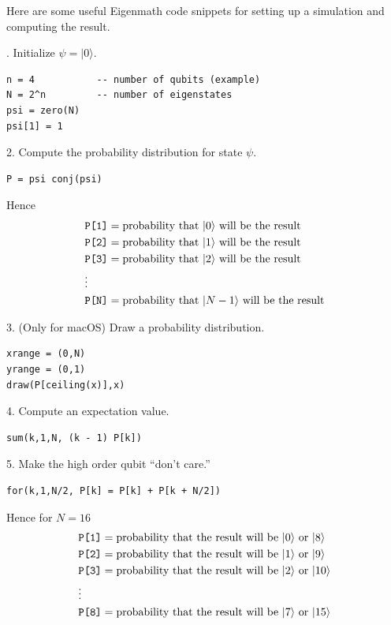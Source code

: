 \documentclass[12pt]{article}
\begin{document}
Here are some useful Eigenmath code snippets for setting up a simulation
and computing the result.

. Initialize $\psi=|0\rangle$.
{\color{blue}
\begin{verbatim}
n = 4           -- number of qubits (example)
N = 2^n         -- number of eigenstates
psi = zero(N)
psi[1] = 1
\end{verbatim}
}

2. Compute the probability distribution for state $\psi$.
{\color{blue}
\begin{verbatim}
P = psi conj(psi)
\end{verbatim}
}

Hence
\begin{align*}
&\text{\tt P[1]}=\text{probability that $|0\rangle$ will be the result}
\\
&\text{\tt P[2]}=\text{probability that $|1\rangle$ will be the result}
\\
&\text{\tt P[3]}=\text{probability that $|2\rangle$ will be the result}
\\
&\vdots
\\
&\text{\tt P[N]}=\text{probability that $|N-1\rangle$ will be the result}
\end{align*}

3. (Only for macOS) Draw a probability distribution.
{\color{blue}
\begin{verbatim}
xrange = (0,N)
yrange = (0,1)
draw(P[ceiling(x)],x)
\end{verbatim}
}

4. Compute an expectation value.
{\color{blue}
\begin{verbatim}
sum(k,1,N, (k - 1) P[k])
\end{verbatim}
}

5. Make the high order qubit ``don't care.''
{\color{blue}
\begin{verbatim}
for(k,1,N/2, P[k] = P[k] + P[k + N/2])
\end{verbatim}
}

Hence for $N=16$
\begin{align*}
&\text{\tt P[1]}=\text{probability that the result will be $|0\rangle$ or $|8\rangle$}
\\
&\text{\tt P[2]}=\text{probability that the result will be $|1\rangle$ or $|9\rangle$}
\\
&\text{\tt P[3]}=\text{probability that the result will be $|2\rangle$ or $|10\rangle$}
\\
&\vdots
\\
&\text{\tt P[8]}=\text{probability that the result will be $|7\rangle$ or $|15\rangle$}
\end{align*}
\end{document}
